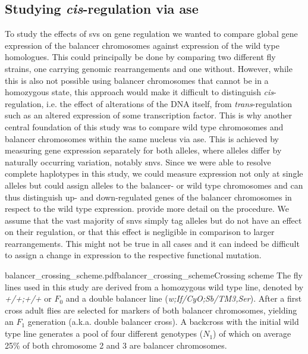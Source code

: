 \subsection{Studying \texorpdfstring{\textit{cis}}{cis}-regulation via
    \texorpdfstring{\acl{ase}}{allele-specific expression}}
\label{sec:balancer_ase_motivation}

To study the effects of \acp{sv} on gene regulation we wanted to compare global
gene expression of the balancer chromosomes against expression of the wild type
homologues. This could principally be done by comparing two different fly
strains, one carrying genomic rearrangements and one without. However, while
this is also not possible using balancer chromosomes that cannot be
in a homozygous state, this approach would make it difficult to distinguish
\textit{cis}-regulation, i.e. the effect of alterations of the DNA itself, from
\textit{trans}-regulation such as an altered expression of some transcription
factor. This is why another central foundation of this study was to compare wild
type chromosomes and balancer chromosomes within the same nucleus via \acf{ase}.
This is achieved by measuring gene expression separately for both alleles, where
alleles differ by naturally occurring variation, notably \acp{snv}.
Since we were able to resolve complete haplotypes in this study, we could
measure expression not only at single alleles but could assign alleles to
the balancer- or wild type chromosomes and can thus distinguish up- and
down-regulated genes of the balancer chromosomes in respect to the wild type
expression.  provide
more detail on the procedure.
We assume that the vast majority of \acp{snv} simply tag alleles but do not have
an effect on their regulation, or that this effect is negligible in comparison
to larger rearrangements. This might not be true in all cases and it can indeed
be difficult to assign a change in expression to the respective functional
mutation.



    {balancer_crossing_scheme.pdf}{balancer_crossing_scheme}{Crossing scheme}{
        The fly lines used in this study are derived from a homozygous wild type
        line, denoted by \textit{+/+;+/+} or $F_0$ and a double balancer line
        (\textit{w;If/CyO;Sb/TM3,Ser}). After a first cross adult flies are
        selected for markers of both balancer chromosomes, yielding an $F_1$
        generation (a.k.a. double balancer cross). A backcross with the initial
        wild type line generates a pool of four different genotypes ($N_1$)
        of which on average 25\% of both chromosome 2 and 3 are balancer
        chromosomes.}



